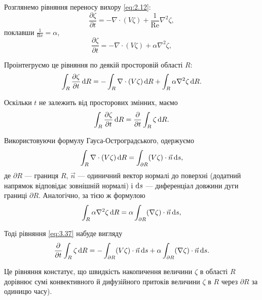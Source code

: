Розглянемо рівняння переносу вихору \eqref{eq:2.12}:
\begin{equation*}
    \frac{\partial \zeta}{\partial t} = - \nabla \cdot (V \zeta) + \frac{1}{\text{Re}} \nabla^2 \zeta,
\end{equation*}
поклавши $\frac{1}{\text{Re}} = \alpha$,
\begin{equation}
    \label{eq:3.36}
    \frac{\partial \zeta}{\partial t} = - \nabla \cdot (V \zeta) + \alpha \nabla^2 \zeta,
\end{equation}

Проінтегруємо це рівняння по деякій просторовій області $R$:
\begin{equation}
    \label{eq:3.37}
    \int_R \frac{\partial \zeta}{\partial t} \mathop{}\!\mathrm{d} R = - \int_R \nabla \cdot (V \zeta) \mathop{}\!\mathrm{d} R + \int_R \alpha \nabla^2 \zeta \mathop{}\!\mathrm{d} R.
\end{equation}

Оскільки $t$ не залежить від просторових змінних, маємо
\begin{equation}
    \label{eq:3.38}
    \int_R \frac{\partial \zeta}{\partial t} \mathop{}\!\mathrm{d} R = \frac{\partial}{\partial t} \int_R \zeta \mathop{}\!\mathrm{d} R.
\end{equation}

Використовуючи формулу Гауса-Остроградського, одержуємо
\begin{equation}
    \label{eq:3.39}
    \int_R \nabla \cdot (V \zeta) \diff R = \int_{\partial R} (V \zeta) \cdot \vec n \diff s,
\end{equation}
де $\partial R$ --- границя $R$, $\vec n$ --- одиничний вектор нормалі до поверхні (додатний напрямок відповідає зовнішній нормалі) і $\mathop{}\!\mathrm{d} s$ --- диференціал довжини дуги границі $\partial R$. Аналогічно, за тією ж формулою
\begin{equation}
    \label{eq:3.40}
    \int_R \alpha \nabla^2 \zeta \diff R = \alpha \int_{\partial R} (\nabla \zeta) \cdot \vec n \diff s,
\end{equation}

Тоді рівняння \eqref{eq:3.37} набуде вигляду
\begin{equation}
    \label{eq:3.41}
    \frac{\partial}{\partial t} \int_R \zeta \diff R = - \int_{\partial R} (V \zeta) \cdot \vec n \diff s + \alpha \int_{\partial R} (\nabla \zeta) \cdot \vec n \diff s.
\end{equation}

Це рівняння констатує, що швидкість накопичення величини $\zeta$ в області $R$ дорівнює сумі конвективного й дифузійного притоків величини $\zeta$ в $R$ через $\partial R$ за одиницю часу). 

